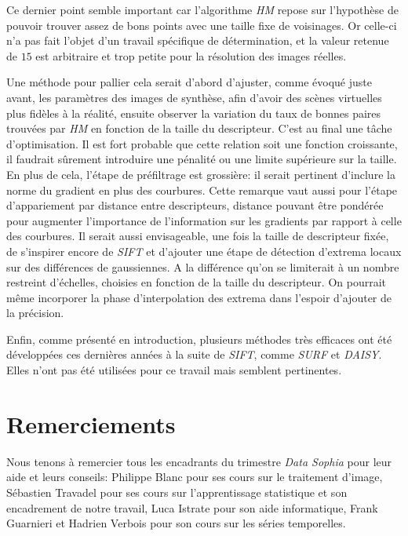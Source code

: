 \documentclass[
	a4paper, %
	10pt, %
	unnumberedsections, %
	twoside, %
]{LTJournalArticle}
\begin{document}
Ce dernier point semble important car l'algorithme \textit{HM} repose sur l'hypothèse
de pouvoir trouver assez de bons points avec une taille fixe de voisinages. Or celle-ci
n'a pas fait l'objet d'un travail spécifique de détermination, et la valeur retenue de $15$
est arbitraire et trop petite pour la résolution des images réelles.

Une méthode pour pallier cela serait d'abord d'ajuster, comme évoqué juste avant, les paramètres des
images de synthèse, afin d'avoir des scènes virtuelles plus fidèles à la réalité, ensuite
observer la variation du taux de bonnes paires trouvées par \textit{HM} en fonction de la taille du descripteur. C'est au final une tâche d'optimisation.
Il est fort probable que cette relation soit une fonction croissante,
il faudrait sûrement introduire une pénalité ou une limite
supérieure sur la taille.
En plus de cela, l'étape de préfiltrage est grossière: il serait pertinent d'inclure
la norme du gradient en plus des courbures. Cette remarque vaut aussi pour l'étape
d'appariement par distance entre descripteurs, distance pouvant être
pondérée pour augmenter l'importance de l'information sur les gradients par rapport
à celle des courbures.
Il serait aussi envisageable, une fois la taille de descripteur fixée, de s'inspirer
encore de \textit{SIFT} et d'ajouter une étape de détection d'extrema
locaux sur des différences de gaussiennes. A la différence qu'on se limiterait à
un nombre restreint d'échelles, choisies en fonction de la taille du descripteur.
On pourrait même incorporer la phase d'interpolation des extrema dans l'espoir
d'ajouter de la précision.

Enfin, comme présenté en introduction, plusieurs méthodes très efficaces ont été développées
ces dernières années à la suite de \textit{\textit{SIFT}}, comme \textit{SURF} et \textit{\textit{DAISY}}.
Elles n'ont pas été utilisées pour ce travail mais semblent pertinentes.

\section{Remerciements}

Nous tenons à remercier tous les encadrants du trimestre \textit{Data Sophia}
pour leur aide et leurs conseils: Philippe Blanc pour ses cours sur le traitement d'image,
Sébastien Travadel pour ses cours sur l'apprentissage statistique et son encadrement de notre travail,
Luca Istrate pour son aide informatique, Frank Guarnieri et Hadrien Verbois pour son cours sur
les séries temporelles.
\end{document}
